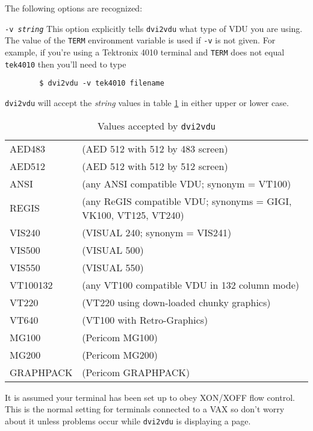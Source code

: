 The following options are recognized:
\begin{list}
{}
{
\settowidth{\labelsep}{aaaa}
\settowidth{\rightmargin}{aaa}
\addtolength{\labelwidth}{\labelsep}
\setlength{\leftmargin}{\labelwidth}}

\item[\tt -v \em string]
This option explicitly tells {\tt dvi2vdu} what type of VDU you are using. The value
of the {\tt TERM} environment variable is used if {\tt-v} is not given. For
example, if you're using a Tektronix 4010 terminal and {\tt TERM} does not
equal {\tt tek4010} then you'll need to type 
\begin{verbatim}
        $ dvi2vdu -v tek4010 filename
\end{verbatim}
{\tt dvi2vdu} will accept the  {\em string\/}
values in table \ref{table:dvi2vduvalues} in either upper or lower case.
\begin{table}[h]
\begin{center}
\begin{tabular}{ll}

AED483&    (AED 512 with 512 by 483 screen)\\
AED512&    (AED 512 with 512 by 512 screen)\\
ANSI&      (any ANSI compatible VDU; synonym = VT100)\\
REGIS&     (any ReGIS compatible VDU; synonyms = GIGI, VK100,
                                                   VT125, VT240)\\
VIS240&    (VISUAL 240; synonym = VIS241)\\
VIS500&    (VISUAL 500)\\
VIS550&    (VISUAL 550)\\
VT100132&  (any VT100 compatible VDU in 132 column mode)\\
VT220&     (VT220 using down-loaded chunky graphics)\\
VT640&     (VT100 with Retro-Graphics)\\
MG100&     (Pericom MG100)\\
MG200&     (Pericom MG200)\\
GRAPHPACK&     (Pericom GRAPHPACK)\\
\end{tabular}
\caption{Values accepted by {\tt dvi2vdu}}
\label{table:dvi2vduvalues}
\end{center}
\end{table}
It is assumed your terminal has been set up to obey XON/XOFF flow control.
This is the normal setting for terminals connected to a VAX so don't worry
about it unless problems occur while {\tt dvi2vdu} is displaying a page.


\end{list}
